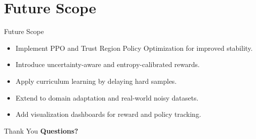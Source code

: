 \documentclass{beamer}
\begin{document}

\section{Future Scope}
\begin{frame}{Future Scope}
  \begin{itemize}
    \item Implement PPO and Trust Region Policy Optimization for improved stability.
    \item Introduce uncertainty-aware and entropy-calibrated rewards.
    \item Apply curriculum learning by delaying hard samples.
    \item Extend to domain adaptation and real-world noisy datasets.
    \item Add visualization dashboards for reward and policy tracking.
  \end{itemize}
\end{frame}


\begin{frame}{Thank You}
  \centering
  \textbf{Questions?}
\end{frame}
\end{document}
